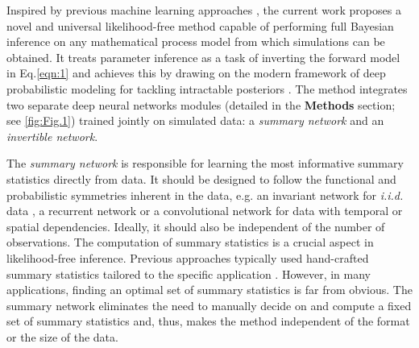 \documentclass[9pt,twoside,lineno]{pnas-new}
\begin{document}
Inspired by previous machine learning approaches \cite{hwang2018conditional, mestdagh2018prepaid, raynal2018abc, jiang2017learning, lueckmann2017flexible, papamakarios2016fast}, the current work proposes a novel and universal likelihood-free method capable of performing full Bayesian inference on any mathematical process model from which simulations can be obtained. It treats parameter inference as a task of inverting the forward model in Eq.\ref{eqn:1} and achieves this by drawing on the modern framework of deep probabilistic modeling for tackling intractable posteriors \cite{ardizzone2018analyzing, kingma2018glow, grover2018flow, dinh2016density}. The method integrates two separate deep neural networks modules (detailed in the \textbf{Methods} section; see \autoref{fig:Fig.1}) trained jointly on simulated data: a \textit{summary network} and an \textit{invertible network}. 

The \textit{summary network} is responsible for learning the most informative summary statistics directly from data. It should be designed to follow the functional and probabilistic symmetries inherent in the data, e.g. an invariant network for \textit{i.i.d.} data \cite{bloem2019probabilistic}, a recurrent network \cite{gers1999learning} or a convolutional network \cite{long2015fully} for data with temporal or spatial dependencies. Ideally, it should also be independent of the number of observations. The computation of summary statistics is a crucial aspect in likelihood-free inference. Previous approaches typically used hand-crafted summary statistics tailored to the specific application \cite{raynal2018abc, sunnaaker2013approximate}. However, in many applications, finding an optimal set of summary statistics is far from obvious. The summary network eliminates the need to manually decide on and compute a fixed set of summary statistics and, thus, makes the method independent of the format or the size of the data.
\end{document}
